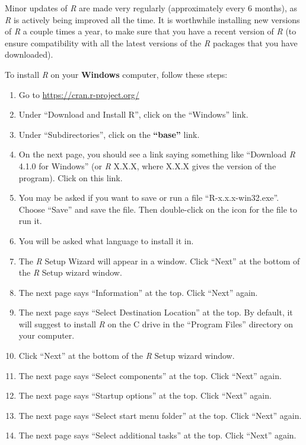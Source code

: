 \documentclass[
]{book}
\providecommand{\tightlist}{%
  \setlength{\itemsep}{0pt}\setlength{\parskip}{0pt}}
\begin{document}
Minor updates of \emph{R} are made very regularly (approximately every 6 months), as \emph{R} is actively being improved all the time. It is worthwhile installing new versions of \emph{R} a couple times a year, to make sure that you have a recent version of \emph{R} (to ensure compatibility with all the latest versions of the \emph{R} packages that you have downloaded).

To install \emph{R} on your \textbf{Windows} computer, follow these steps:

\begin{enumerate}
\def\labelenumi{\arabic{enumi}.}
\tightlist
\item
  Go to \url{https://cran.r-project.org/}
\item
  Under ``Download and Install R'', click on the ``Windows'' link.
\item
  Under ``Subdirectories'', click on the \textbf{``base''} link.
\item
  On the next page, you should see a link saying something like ``Download \emph{R} 4.1.0 for Windows'' (or \emph{R} X.X.X, where X.X.X gives the version of the program). Click on this link.
\item
  You may be asked if you want to save or run a file ``R-x.x.x-win32.exe''. Choose ``Save'' and save the file. Then double-click on the icon for the file to run it.
\item
  You will be asked what language to install it in.
\item
  The \emph{R} Setup Wizard will appear in a window. Click ``Next'' at the bottom of the \emph{R} Setup wizard window.
\item
  The next page says ``Information'' at the top. Click ``Next'' again.
\item
  The next page says ``Select Destination Location'' at the top. By default, it will suggest to install \emph{R} on the C drive in the ``Program Files'' directory on your computer.
\item
  Click ``Next'' at the bottom of the \emph{R} Setup wizard window.
\item
  The next page says ``Select components'' at the top. Click ``Next'' again.
\item
  The next page says ``Startup options'' at the top. Click ``Next'' again.
\item
  The next page says ``Select start menu folder'' at the top. Click ``Next'' again.
\item
  The next page says ``Select additional tasks'' at the top. Click ``Next'' again.

\end{enumerate}
\end{document}
